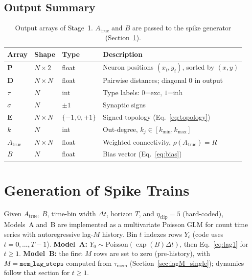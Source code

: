 \documentclass[11pt]{article}
\begin{document}
\subsection{Output Summary}

\begin{table}[h]
\centering
\begin{tabular}{llll}
\toprule
Array & Shape & Type & Description \\
\midrule
$\mathbf{P}$          & $N\times 2$ & float
  & Neuron positions $(x_i,y_i)$, sorted by $(x,y)$ \\
$\mathbf{D}$          & $N\times N$ & float
  & Pairwise distances; diagonal $0$ in output \\
$\tau$                & $N$         & int
  & Type labels: $0$=exc, $1$=inh \\
$\sigma$              & $N$         & $\pm1$
  & Synaptic signs \\
$\mathbf{E}$          & $N\times N$ & $\{-1,0,+1\}$
  & Signed topology (Eq.~\ref{eq:topology}) \\
$k$                   & $N$         & int
  & Out-degree, $k_j\in[k_{\text{min}},k_{\text{max}}]$ \\
$A_{\text{true}}$     & $N\times N$ & float
  & Weighted connectivity, $\rho(A_{\text{true}})=R$ \\
$B$                   & $N$         & float
  & Bias vector (Eq.~\ref{eq:bias}) \\
\bottomrule
\end{tabular}
\caption{Output arrays of Stage~1.
$A_{\text{true}}$ and $B$ are passed to the spike generator
(Section~\ref{sec:spike_gen}).}
\label{tab:output}
\end{table}

\section{Generation of Spike Trains}
\label{sec:spike_gen}

Given $A_{\text{true}}$, $B$, time-bin width $\Delta t$, horizon
$T$, and $\eta_{\mathrm{clip}}=5$ (hard-coded), Models~A and~B are
implemented as a multivariate Poisson GLM for count time series with
autoregressive lag-$M$ history.  Bin $t$ indexes rows $Y_t$ (code uses
$t=0,\dots,T-1$).
\textbf{Model~A:} $Y_0\sim\mathrm{Poisson}(\exp(B)\Delta t)$, then
Eq.~\eqref{eq:lag1} for $t\ge 1$.
\textbf{Model~B:} the first $M$ rows are set to zero (pre-history),
with $M=\texttt{mem\_lag\_steps}$ computed from $\tau_{\mathrm{mem}}$
(Section~\ref{sec:lagM_single}); dynamics follow that section for $t\ge 1$.
\end{document}
